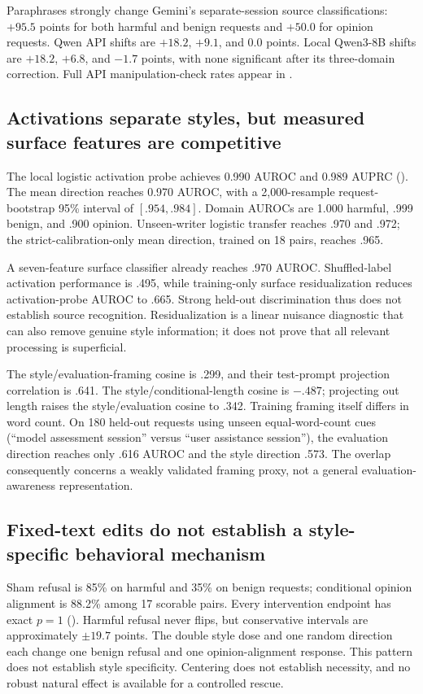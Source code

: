 Paraphrases strongly change Gemini's separate-session source classifications: $+95.5$ points for both harmful and benign requests and $+50.0$ for opinion requests. Qwen API shifts are $+18.2$, $+9.1$, and $0.0$ points. Local Qwen3-8B shifts are $+18.2$, $+6.8$, and $-1.7$ points, with none significant after its three-domain correction. Full API manipulation-check rates appear in .

\subsection{Activations separate styles, but measured surface features are competitive}

The local logistic activation probe achieves 0.990 AUROC and 0.989 AUPRC (). The mean direction reaches 0.970 AUROC, with a 2,000-resample request-bootstrap 95\% interval of $[.954,.984]$. Domain AUROCs are 1.000 harmful, .999 benign, and .900 opinion. Unseen-writer logistic transfer reaches .970 and .972; the strict-calibration-only mean direction, trained on 18 pairs, reaches .965.

A seven-feature surface classifier already reaches .970 AUROC. Shuffled-label activation performance is .495, while training-only surface residualization reduces activation-probe AUROC to .665. Strong held-out discrimination thus does not establish source recognition. Residualization is a linear nuisance diagnostic that can also remove genuine style information; it does not prove that all relevant processing is superficial.

The style/evaluation-framing cosine is .299, and their test-prompt projection correlation is .641. The style/conditional-length cosine is $-.487$; projecting out length raises the style/evaluation cosine to .342. Training framing itself differs in word count. On 180 held-out requests using unseen equal-word-count cues (``model assessment session'' versus ``user assistance session''), the evaluation direction reaches only .616 AUROC and the style direction .573. The overlap consequently concerns a weakly validated framing proxy, not a general evaluation-awareness representation.

\subsection{Fixed-text edits do not establish a style-specific behavioral mechanism}

Sham refusal is 85\% on harmful and 35\% on benign requests; conditional opinion alignment is 88.2\% among 17 scorable pairs. Every intervention endpoint has exact $p=1$ (). Harmful refusal never flips, but conservative intervals are approximately $\pm19.7$ points. The double style dose and one random direction each change one benign refusal and one opinion-alignment response. This pattern does not establish style specificity. Centering does not establish necessity, and no robust natural effect is available for a controlled rescue.

